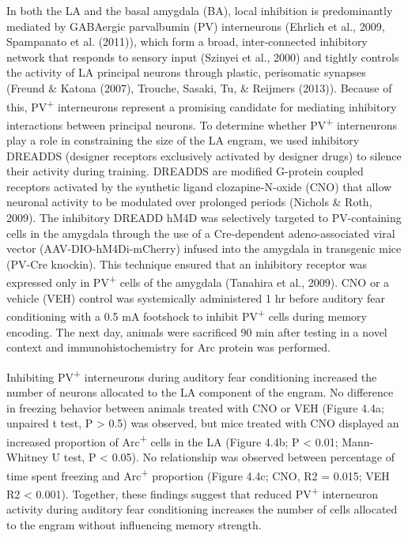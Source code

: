 \documentclass[12pt,a4paperpaper,]{report}
\begin{document}
In both the LA and the basal amygdala (BA), local inhibition is
predominantly mediated by GABAergic parvalbumin (PV) interneurons
(Ehrlich et al., 2009, Spampanato et al. (2011)), which form a broad,
inter-connected inhibitory network that responds to sensory input
(Szinyei et al., 2000) and tightly controls the activity of LA principal
neurons through plastic, perisomatic synapses (Freund \& Katona (2007),
Trouche, Sasaki, Tu, \& Reijmers (2013)). Because of this,
PV\textsuperscript{+} interneurons represent a promising candidate for
mediating inhibitory interactions between principal neurons. To
determine whether PV\textsuperscript{+} interneurons play a role in
constraining the size of the LA engram, we used inhibitory DREADDS
(designer receptors exclusively activated by designer drugs) to silence
their activity during training. DREADDS are modified G-protein coupled
receptors activated by the synthetic ligand clozapine-N-oxide (CNO) that
allow neuronal activity to be modulated over prolonged periods (Nichols
\& Roth, 2009). The inhibitory DREADD hM4D was selectively targeted to
PV-containing cells in the amygdala through the use of a Cre-dependent
adeno-associated viral vector (AAV-DIO-hM4Di-mCherry) infused into the
amygdala in transgenic mice (PV-Cre knockin). This technique ensured
that an inhibitory receptor was expressed only in PV\textsuperscript{+}
cells of the amygdala (Tanahira et al., 2009). CNO or a vehicle (VEH)
control was systemically administered 1 hr before auditory fear
conditioning with a 0.5 mA footshock to inhibit PV\textsuperscript{+}
cells during memory encoding. The next day, animals were sacrificed 90
min after testing in a novel context and immunohistochemistry for Arc
protein was performed.

Inhibiting PV\textsuperscript{+} interneurons during auditory fear
conditioning increased the number of neurons allocated to the LA
component of the engram. No difference in freezing behavior between
animals treated with CNO or VEH (Figure 4.4a; unpaired t test, P
\textgreater{} 0.5) was observed, but mice treated with CNO displayed an
increased proportion of Arc\textsuperscript{+} cells in the LA (Figure
4.4b; P \textless{} 0.01; Mann-Whitney U test, P \textless{} 0.05). No
relationship was observed between percentage of time spent freezing and
Arc\textsuperscript{+} proportion (Figure 4.4c; CNO, R2 = 0.015; VEH R2
\textless{} 0.001). Together, these findings suggest that reduced
PV\textsuperscript{+} interneuron activity during auditory fear
conditioning increases the number of cells allocated to the engram
without influencing memory strength.
\end{document}
